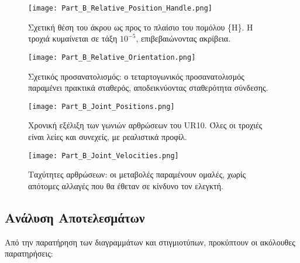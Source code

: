 \documentclass[a4paper,12pt]{report}
\newcommand{\en}{\selectlanguage{english}}
\newcommand{\gr}{\selectlanguage{greek}}
\begin{document}
\begin{figure}[H]
    \centering
    \begin{minipage}{0.48\textwidth}
        \centering
        \texttt{[image: Part\_B\_Relative\_Position\_Handle.png]}
        \caption{Σχετική θέση του άκρου ως προς το πλαίσιο του πομόλου \{H\}. Η τροχιά κυμαίνεται σε τάξη $10^{-5}$, επιβεβαιώνοντας ακρίβεια.}
    \end{minipage}
    \hfill
    \begin{minipage}{0.48\textwidth}
        \centering
        \texttt{[image: Part\_B\_Relative\_Orientation.png]}
        \caption{Σχετικός προσανατολισμός: ο τεταρτογωνικός προσανατολισμός παραμένει πρακτικά σταθερός, αποδεικνύοντας σταθερότητα σύνδεσης.}
    \end{minipage}
\end{figure}

\vspace{0.3cm}

\begin{figure}[H]
    \centering
    \begin{minipage}{0.48\textwidth}
        \centering
        \texttt{[image: Part\_B\_Joint\_Positions.png]}
        \caption{Χρονική εξέλιξη των γωνιών αρθρώσεων του \en UR10\gr. Όλες οι τροχιές είναι λείες και συνεχείς, με ρεαλιστικά προφίλ.}
    \end{minipage}
    \hfill
    \begin{minipage}{0.48\textwidth}
        \centering
        \texttt{[image: Part\_B\_Joint\_Velocities.png]}
        \caption{Ταχύτητες αρθρώσεων: οι μεταβολές παραμένουν ομαλές, χωρίς απότομες αλλαγές που θα έθεταν σε κίνδυνο τον ελεγκτή.}
    \end{minipage}
\end{figure}

\vspace{0.4cm}

\subsection{Ανάλυση Αποτελεσμάτων}

Από την παρατήρηση των διαγραμμάτων και στιγμιοτύπων, προκύπτουν οι ακόλουθες παρατηρήσεις:
\end{document}
